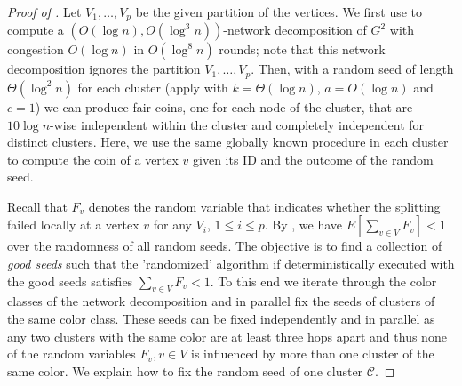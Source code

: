 \begin{proof}[Proof of ]
Let $V_1,\ldots,V_p$ be the given partition of the vertices. 
We first use  to compute a $(O(\log n),O(\log^3 n))$-network decomposition of $G^2$ with congestion $O(\log n)$ in $O(\log^8 n)$ rounds; note that this network decomposition ignores the partition $V_1,\ldots,V_p$. Then, with a random seed of length $\Theta(\log^2 n)$ for each cluster (apply  with $k=\Theta(\log n)$, $a=O(\log n)$ and $c=1$) we can produce fair coins, one for each node of the cluster,  that are $10\log n$-wise independent within the cluster and completely independent for distinct clusters. Here, we use the same globally known procedure in each cluster to compute the coin of a vertex $v$ given its ID and the outcome of the random seed. 

Recall that $F_v$ denotes the random variable that indicates whether the splitting failed locally at a  vertex $v$ for any $V_i$, $1\leq i\leq p$.
By , we have $E[\sum_{v\in V}F_v]<1$ over the randomness of all random seeds.  The objective is to find a collection of \emph{good seeds} 
such that the 'randomized' algorithm if deterministically executed with the good seeds satisfies $\sum_{v\in V}F_v<1$. 
To this end we iterate through the color classes of the network decomposition and in parallel fix the seeds of clusters of the same color class. These seeds can be fixed independently and in parallel as any two clusters with the same color are at least three hops apart and thus none of the random variables $F_v,v\in V$ is influenced by more than one cluster of the same color. We explain how to fix the random seed of one cluster $\mathcal{C}$. 


\end{proof}

